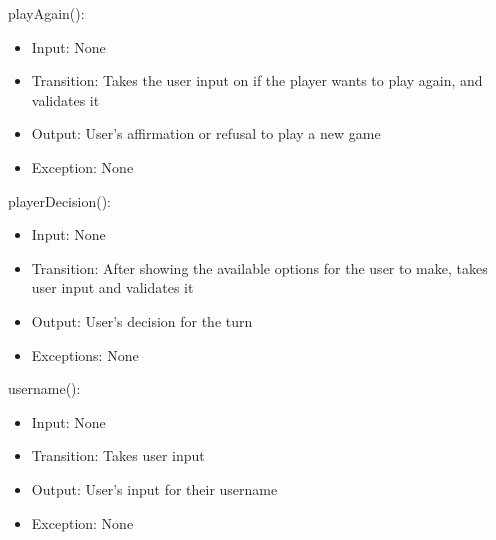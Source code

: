 \documentclass[12pt, titlepage]{article}
\begin{document}
\noindent playAgain():
\begin{itemize}
    \item Input: None
    \item Transition: Takes the user input on if the player wants to play again, and validates it
    \item Output: User's affirmation or refusal to play a new game
    \item Exception: None
\end{itemize}

\noindent playerDecision():
\begin{itemize}
    \item Input: None
    \item Transition: After showing the available options for the user to make, takes user input and validates it
    \item Output: User's decision for the turn
    \item Exceptions: None
\end{itemize}

\noindent username():
\begin{itemize}
    \item Input: None
    \item Transition: Takes user input
    \item Output: User's input for their username
    \item Exception: None
\end{itemize}
\end{document}
